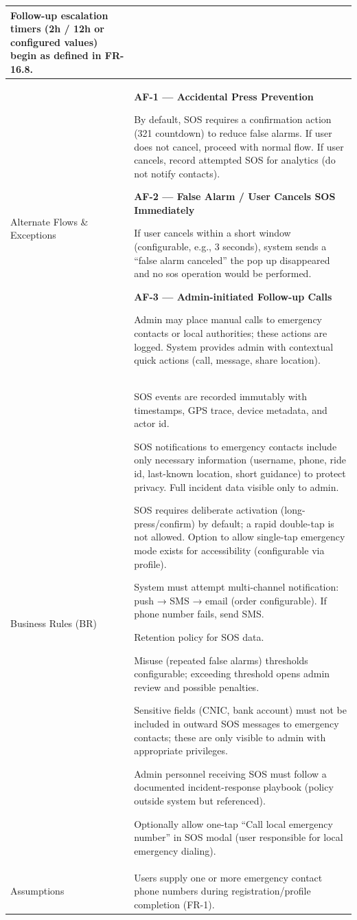 \begin{longtable}{|p{3.5cm}|p{12cm}|}
Follow-up escalation timers (2h / 12h or configured values) begin as defined in FR-16.8. \\
\hline
Alternate Flows \& Exceptions &
\textbf{AF-1 --- Accidental Press Prevention}

By default, SOS requires a confirmation action (321 countdown) to reduce false alarms. If user does not cancel, proceed with normal flow. If user cancels, record attempted SOS for analytics (do not notify contacts).

\textbf{AF-2 --- False Alarm / User Cancels SOS Immediately}

If user cancels within a short window (configurable, e.g., 3 seconds), system sends a “false alarm canceled” the pop up disappeared and no sos operation would be performed.

\textbf{AF-3 --- Admin-initiated Follow-up Calls}

Admin may place manual calls to emergency contacts or local authorities; these actions are logged. System provides admin with contextual quick actions (call, message, share location). \\
\hline
Business Rules (BR) &
SOS events are recorded immutably with timestamps, GPS trace, device metadata, and actor id.

SOS notifications to emergency contacts include only necessary information (username, phone, ride id, last-known location, short guidance) to protect privacy. Full incident data visible only to admin.

SOS requires deliberate activation (long-press/confirm) by default; a rapid double-tap is not allowed. Option to allow single-tap emergency mode exists for accessibility (configurable via profile).

System must attempt multi-channel notification: push → SMS → email (order configurable). If phone number fails, send SMS.

Retention policy for SOS data.

Misuse (repeated false alarms) thresholds configurable; exceeding threshold opens admin review and possible penalties.

Sensitive fields (CNIC, bank account) must not be included in outward SOS messages to emergency contacts; these are only visible to admin with appropriate privileges.

Admin personnel receiving SOS must follow a documented incident-response playbook (policy outside system but referenced).

Optionally allow one-tap “Call local emergency number” in SOS modal (user responsible for local emergency dialing). \\
\hline
Assumptions &
Users supply one or more emergency contact phone numbers during registration/profile completion (FR-1).


\end{longtable}
